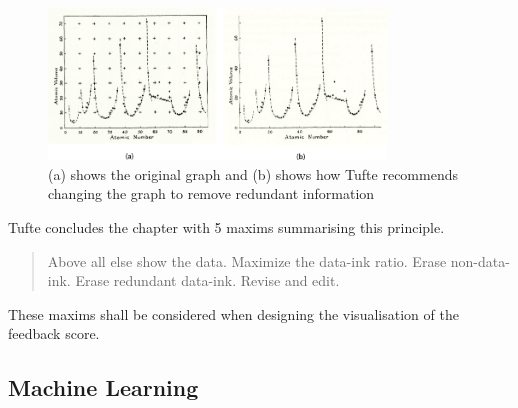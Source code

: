 \begin{figure}[h!]
\centering
\includegraphics[width=0.8\textwidth]{images/tuftegraphs.png}
\caption{(a) shows the original graph and (b) shows how Tufte recommends changing the graph to remove redundant information}
\label{fig:tuftegraphs}
\end{figure}


Tufte concludes the chapter with 5 maxims summarising this principle.

\begin{verse}Above all else show the data.
	Maximize the data-ink ratio.
	Erase non-data-ink.
	Erase redundant data-ink.
Revise and edit.
\end{verse}

These maxims shall be considered when designing the visualisation of the feedback score.

\subsection{Machine Learning}
